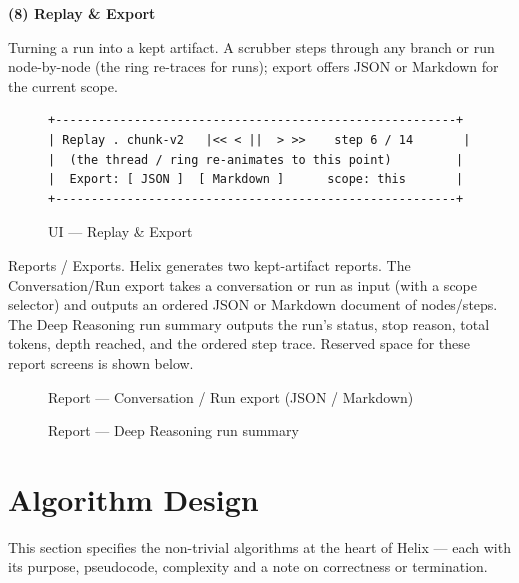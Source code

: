 \documentclass[12pt,a4paper]{report}
\begin{document}
\noindent\textbf{(8) Replay \& Export}

Turning a run into a kept artifact. A scrubber steps through any branch or run node-by-node (the ring re-traces for runs); export offers JSON or Markdown for the current scope.

\begin{figure}[H]\centering
\begin{lstlisting}
+--------------------------------------------------------+
| Replay . chunk-v2   |<< < ||  > >>    step 6 / 14       |
|  (the thread / ring re-animates to this point)         |
|  Export: [ JSON ]  [ Markdown ]      scope: this       |
+--------------------------------------------------------+
\end{lstlisting}
\caption{UI --- Replay \& Export}
\end{figure}

Reports / Exports. Helix generates two kept-artifact reports. The Conversation/Run export takes a conversation or run as input (with a scope selector) and outputs an ordered JSON or Markdown document of nodes/steps. The Deep Reasoning run summary outputs the run's status, stop reason, total tokens, depth reached, and the ordered step trace. Reserved space for these report screens is shown below.

\begin{figure}[H]\centering
{}
\caption{Report --- Conversation / Run export (JSON / Markdown)}
\end{figure}

\begin{figure}[H]\centering
{}
\caption{Report --- Deep Reasoning run summary}
\end{figure}

\section{Algorithm Design}
This section specifies the non-trivial algorithms at the heart of Helix --- each with its purpose, pseudocode, complexity and a note on correctness or termination.
\end{document}
